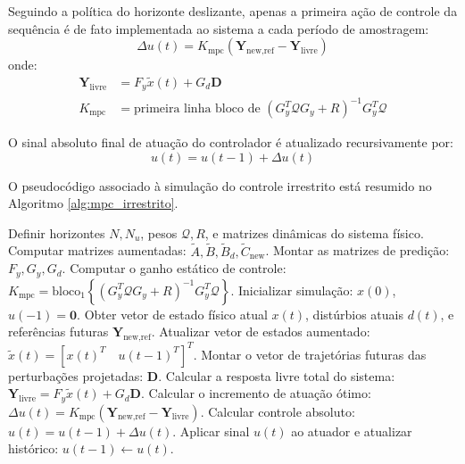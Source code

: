 \documentclass[12pt]{article}
\begin{document}
Seguindo a política do horizonte deslizante, apenas a primeira ação de controle da sequência é de fato implementada ao sistema a cada período de amostragem:
\begin{equation}
\Delta u(t) = K_{\text{mpc}} (\bm{Y}_{\text{new,ref}} - \bm{Y}_{\text{livre}})
\end{equation}
onde:
\begin{align}
\bm{Y}_{\text{livre}} &= F_y \tilde{x}(t) + G_d \bm{D} \\
K_{\text{mpc}} &= \text{primeira linha bloco de } \left( G_y^T \mathcal{Q} G_y + R \right)^{-1} G_y^T \mathcal{Q}
\end{align}

O sinal absoluto final de atuação do controlador é atualizado recursivamente por:
\begin{equation}
u(t) = u(t-1) + \Delta u(t)
\end{equation}

O pseudocódigo associado à simulação do controle irrestrito está resumido no Algoritmo \ref{alg:mpc_irrestrito}.

\begin{algorithm}[H]
\caption{Algoritmo MPC Incremental Sem Restrições}
\label{alg:mpc_irrestrito}
\begin{algorithmic}[1]
\STATE Definir horizontes $N, N_u$, pesos $\mathcal{Q}, R$, e matrizes dinâmicas do sistema físico.
\STATE Computar matrizes aumentadas: $\tilde{A}, \tilde{B}, \tilde{B}_d, \tilde{C}_{\text{new}}$.
\STATE Montar as matrizes de predição: $F_y, G_y, G_d$.
\STATE Computar o ganho estático de controle: $K_{\text{mpc}} = \text{bloco}_1\left\{ (G_y^T \mathcal{Q} G_y + R)^{-1} G_y^T \mathcal{Q} \right\}$.
\STATE Inicializar simulação: $x(0)$, $u(-1) = \bm{0}$.
\STATE Obter vetor de estado físico atual $x(t)$, distúrbios atuais $d(t)$, e referências futuras $\bm{Y}_{\text{new,ref}}$.
\STATE Atualizar vetor de estados aumentado: $\tilde{x}(t) = [x(t)^T \quad u(t-1)^T]^T$.
\STATE Montar o vetor de trajetórias futuras das perturbações projetadas: $\bm{D}$.
\STATE Calcular a resposta livre total do sistema: $\bm{Y}_{\text{livre}} = F_y \tilde{x}(t) + G_d \bm{D}$.
\STATE Calcular o incremento de atuação ótimo: $\Delta u(t) = K_{\text{mpc}} (\bm{Y}_{\text{new,ref}} - \bm{Y}_{\text{livre}})$.
\STATE Calcular controle absoluto: $u(t) = u(t-1) + \Delta u(t)$.
\STATE Aplicar sinal $u(t)$ ao atuador e atualizar histórico: $u(t-1) \leftarrow u(t)$.
\end{algorithmic}
\end{algorithm}
\end{document}
